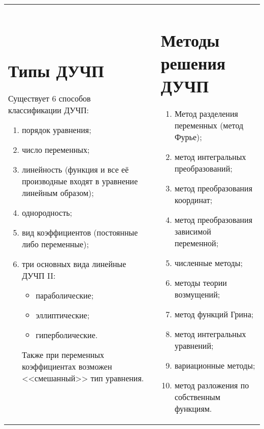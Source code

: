 \begin{table}[h!]
    \begin{tabular}{m{}cm{}}
        \section{Типы ДУЧП}

        Существует 6 способов классификации ДУЧП:
        \begin{enumerate}\itemsep-.4em
            \item порядок уравнения;
            \item число переменных;
            \item линейность (функция и все её производные входят в уравнение
            линейным образом);
            \item однородность;
            \item вид коэффициентов (постоянные либо переменные);
            \item три основных вида линейные ДУЧП II:
            \begin{itemize}\itemsep-.4em
                \item параболические;
                \item эллиптические;
                \item гиперболические.
            \end{itemize}

            Также при переменных коэффициентах возможен <<смешанный>> тип
            уравнения.
        \end{enumerate}
        & \hfill &
        \section{Методы решения ДУЧП}

        \begin{enumerate}
            \item Метод разделения переменных (метод Фурье);
            \item метод интегральных преобразований;
            \item метод преобразования координат;
            \item метод преобразования зависимой переменной;
            \item численные методы;
            \item методы теории возмущений;
            \item метод функций Грина;
            \item метод интегральных уравнений;
            \item вариационные методы;
            \item метод разложения по собственным функциям.
        \end{enumerate}
    \end{tabular}
\end{table}

